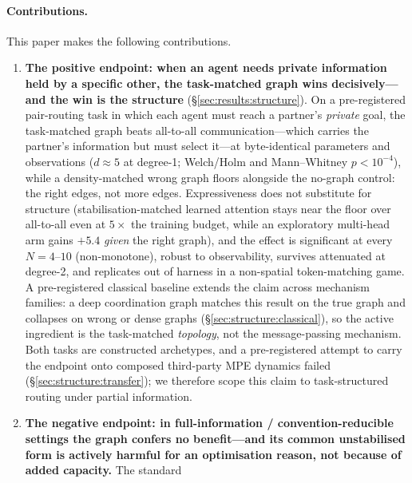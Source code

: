 \paragraph{Contributions.} This paper makes the following contributions.

\begin{enumerate}[leftmargin=*,itemsep=0pt,topsep=2pt]
  \item \textbf{The positive endpoint: when an agent needs private
        information held by a specific other, the task-matched graph wins
        decisively---and the win is the structure}
        (\S\ref{sec:results:structure}). On a pre-registered pair-routing
        task in which each agent must reach a partner's \emph{private} goal,
        the task-matched graph beats all-to-all communication---which
        carries the partner's information but must select it---at
        byte-identical parameters and observations ($d\approx5$ at degree-1;
        Welch/Holm and Mann--Whitney $p<10^{-4}$), while a density-matched
        wrong graph floors alongside the no-graph control: the right edges,
        not more edges. Expressiveness does not substitute for structure
        (stabilisation-matched learned attention stays near the floor over
        all-to-all even at $5\times$ the training budget, while an exploratory
        multi-head arm gains $+5.4$
        \emph{given} the right graph), and the effect is significant at
        every $N{=}4$--$10$ (non-monotone), robust to observability,
        survives attenuated at degree-2, and replicates out of harness in a
        non-spatial token-matching game. A pre-registered classical baseline
        extends the claim across mechanism families: a deep coordination
        graph \citep{boehmer_2020_dcg} matches this result on the true graph
        and collapses on wrong or dense graphs
        (\S\ref{sec:structure:classical}), so the active ingredient is the
        task-matched \emph{topology}, not the message-passing mechanism.
        Both tasks are constructed archetypes, and a pre-registered attempt
        to carry the endpoint onto composed third-party \textsc{MPE}
        dynamics failed (\S\ref{sec:structure:transfer}); we therefore scope
        this claim to task-structured routing under partial information.
  \item \textbf{The negative endpoint: in full-information /
        convention-reducible settings the graph confers no benefit---and its
        common unstabilised form is actively harmful for an
        optimisation reason, not because of added capacity.} The standard

\end{enumerate}
